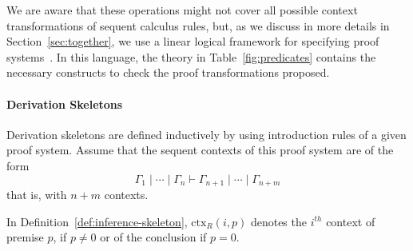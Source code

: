 \documentclass{new_tlp}
\newenvironment{MyQuote}{%
    \begin{myQuoteEnumerate}[resume=*,series=MyQuoteSeries]%
    \item \begin{quote}%
}{%
    \end{quote}%
    \end{myQuoteEnumerate}%
}%
\begin{document}
We are aware that these operations might not cover all possible context
transformations of sequent calculus rules, but,
as we discuss in more details in Section~\ref{sec:together}, we use a linear logical framework
for specifying proof systems~\cite{nigam11lsfa}. In this language, the theory in Table~\ref{fig:predicates} 
contains the necessary constructs to check the proof transformations proposed.

\paragraph{Derivation Skeletons} 
Derivation skeletons are defined inductively by using introduction rules of a given 
proof system. Assume that the sequent contexts of this proof system are of the 
form 
{\small
\[
\Gamma_1  \mid \cdots \mid \Gamma_n \vdash \Gamma_{n+1} \mid \cdots \mid \Gamma_{n + m}
\]
}
that is, with $n + m$ contexts. 

\newcommand\ctx[2]{\ensuremath{\textrm{ctx}_R(#1,#2)}}

In Definition~\ref{def:inference-skeleton}, $\ctx{i}{p}$ denotes the $i^{th}$
context of premise $p$, if $p \neq 0$ or of the conclusion if $p=0$.
\end{document}
